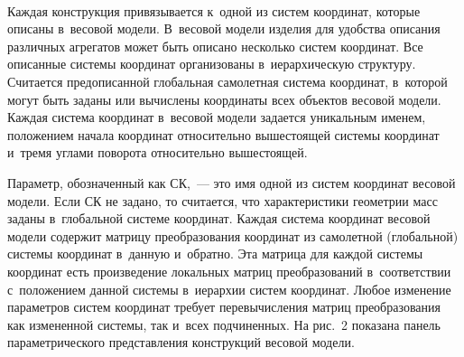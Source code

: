 \begin{multicols}{2}
  \begin{figure*} %
  \vspace*{1pt}
 \begin{center}
 \mbox{%
 \epsfxsize=162mm 
 }
 \end{center}
\vspace*{-9pt}
  \end{figure*}
  
  Каждая конструкция привязывается к~одной из систем координат, которые 
описаны в~весовой модели. В~весовой модели изделия для удобства описания 
различных агрегатов может быть описано несколько систем координат. Все 
описанные сис\-те\-мы координат организованы в~иерархическую структуру. 
Считается предописанной глобальная самолетная система координат, в~которой 
могут быть заданы или вычислены координаты всех объектов весовой модели. 
Каждая система координат в~весовой модели задается уникальным именем, 
положением начала координат относительно вышестоящей системы координат 
и~тремя углами поворота относительно вышестоящей. 

Параметр, 
обозначенный как СК,~--- это имя одной из сис\-тем координат весовой модели. 
Если СК не задано, то считается, что характеристики гео\-мет\-рии масс заданы 
в~глобальной системе координат. Каж\-дая сис\-те\-ма координат весовой модели 
содержит матрицу преобразования координат из самолетной (глобальной) 
системы координат в~данную и~обратно. Эта матрица для каждой системы 
координат есть произведение локальных матриц преобразований 
в~соответствии с~положением данной системы в~иерархии систем координат. 
Любое изменение параметров систем координат требует пе\-ре\-вы\-чис\-ле\-ния 
матриц преобразования как измененной сис\-те\-мы, так и~всех подчиненных. На 
рис.~2 показана панель параметрического пред\-став\-ле\-ния конструкций весовой 
модели.
  

\end{multicols}
